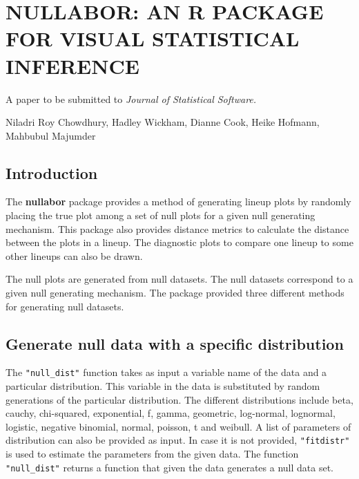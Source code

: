 \chapter{NULLABOR: AN R PACKAGE FOR VISUAL STATISTICAL INFERENCE}\label{ch:nullabor}
\vspace{0.8cm}
\begin{center}
\large{A paper to be submitted to \it{Journal of Statistical Software}.}

\large{Niladri Roy Chowdhury, Hadley Wickham, Dianne Cook, Heike Hofmann, \\
Mahbubul Majumder}\\
\end{center}
\section{Introduction}\label{introduction}

The \textbf{nullabor} package provides a method of generating lineup
plots by randomly placing the true plot among a set of null plots for a
given null generating mechanism. This package also provides distance
metrics to calculate the distance between the plots in a lineup. The
diagnostic plots to compare one lineup to some other lineups can also
be drawn.

The null plots are generated from null datasets. The null datasets
correspond to a given null generating mechanism. The package provided
three different methods for generating null datasets.

\section{Generate null data with a specific
distribution}\label{generate-null-data-with-a-specific-distribution}

The \texttt{"null\_dist"} function takes as input a variable name of the
data and a particular distribution. This variable in the data is
substituted by random generations of the particular distribution. The
different distributions include beta, cauchy, chi-squared, exponential,
f, gamma, geometric, log-normal, lognormal, logistic, negative binomial,
normal, poisson, t and weibull. A list of parameters of distribution can
also be provided as input. In case it is not provided,
\texttt{"fitdistr"} is used to estimate the parameters from the given
data. The function \texttt{"null\_dist"} returns a function that given
the data generates a null data set.

